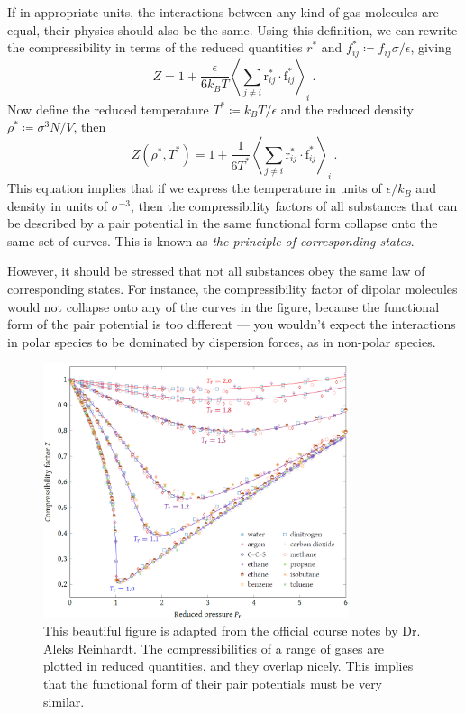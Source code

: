 \documentclass{article}
\theoremstyle{plain}\theoremheaderfont{\normalfont\bfseries}\theorembodyfont{\rmfamily}\theoremseparator{.}\newtheorem*{thm}{Theorem}\newtheorem*{law}{Law}\newtheorem*{pos}{Postulate}
\numberwithin{equation}{section}
\newcommand{\eval}[1]{\left\langle #1 \right\rangle}
\newcommand{\vb}[1]{\bm{\mathrm{#1}}}
\newcommand{\vdot}{\,\bm{\mathrm{\cdot}}\,}
\begin{document}
    If in appropriate units, the interactions between any kind of gas molecules are equal, their physics should also be the same. Using this definition, we can rewrite the compressibility in terms of the reduced quantities \(r^*\) and \(f_{ij}^*\coloneqq f_{ij}\sigma / \epsilon\), giving
    \begin{equation}
        Z=1+\frac{\epsilon}{6k_B T}\eval{\sum_{j\ne i}\vb{r}_{ij}^*\vdot\vb{f}_{ij}^*}_i\,.
    \end{equation}
    Now define the reduced temperature \(T^*\coloneqq k_B T/\epsilon\) and the reduced density \(\rho^*\coloneqq \sigma^3 N/V\), then
    \begin{equation}
        Z(\rho^*, T^*)=1+\frac{1}{6T^*}\eval{\sum_{j\ne i}\vb{r}_{ij}^*\vdot\vb{f}_{ij}^*}_i\,.
    \end{equation}
    This equation implies that if we express the temperature in units of \(\epsilon/k_B\) and density in units of \(\sigma^{-3}\), then the compressibility factors of all substances that can be described by a pair potential in the same functional form collapse onto the same set of curves. This is known as \textit{the principle of corresponding states}.

    However, it should be stressed that not all substances obey the same law of corresponding states. For instance, the compressibility factor of dipolar molecules would not collapse onto any of the curves in the figure, because the functional form of the pair potential is too different --- you wouldn't expect the interactions in polar species to be dominated by dispersion forces, as in non-polar species.

    \begin{figure}
        \centering
        \includegraphics[width=0.8\textwidth]{corresponding_states.png}
        \caption{This beautiful figure is adapted from the official course notes by Dr. Aleks Reinhardt. The compressibilities of a range of gases are plotted in reduced quantities, and they overlap nicely. This implies that the functional form of their pair potentials must be very similar.}
    \end{figure}
\end{document}
